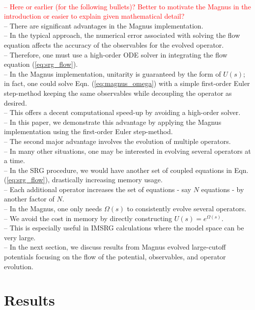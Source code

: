 \documentclass[preprintnumbers,floatfix,aps,prc,preprint,nofootinbib]{revtex4-1}
\begin{document}
\\
\textcolor{red}{-- Here or earlier (for the following bullets)? Better to motivate the Magnus in the introduction or easier to explain given mathematical detail?}
\\
-- There are significant advantages in the Magnus implementation.
\\
-- In the typical approach, the numerical error associated with solving the flow equation affects the accuracy of the observables for the evolved operator.
\\
-- Therefore, one must use a high-order ODE solver in integrating the flow equation (\ref{eq:srg_flow}).
\\
-- In the Magnus implementation, unitarity is guaranteed by the form of $U(s)$; in fact, one could solve Eqn. (\ref{eq:magnus_omega}) with a simple first-order Euler step-method keeping the same observables while decoupling the operator as desired.
\\
-- This offers a decent computational speed-up by avoiding a high-order solver.
\\
-- In this paper, we demonstrate this advantage by applying the Magnus implementation using the first-order Euler step-method.
\\
-- The second major advantage involves the evolution of multiple operators.
\\
-- In many other situations, one may be interested in evolving several operators at a time.
\\
-- In the SRG procedure, we would have another set of coupled equations in Eqn. (\ref{eq:srg_flow}), drastically increasing memory usage.
\\
-- Each additional operator increases the set of equations - say $N$ equations - by another factor of $N$.
\\
-- In the Magnus, one only needs $\Omega(s)$ to consistently evolve several operators.
\\
-- We avoid the cost in memory by directly constructing $U(s)=e^{\Omega(s)}$.
\\
-- This is especially useful in IMSRG calculations where the model space can be very large.
\\
-- In the next section, we discuss results from Magnus evolved large-cutoff potentials focusing on the flow of the potential, observables, and operator evolution.


\section{Results}
\label{sec:results}
\end{document}
